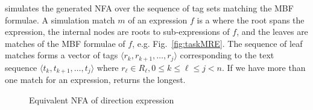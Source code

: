 \framework simulates the generated NFA over the sequence of tag sets matching the MBF formulae.
A simulation match $m$ of an expression $f$ is a  where the root spans the expression, the internal nodes are roots to sub-expressions of $f$, and the leaves are matches of the MBF formulae of $f$, e.g. Fig.~\ref{fig:taskMRE}.
The sequence of leaf matches forms a vector of tags $\langle r_k,r_{k+1},\dots,r_j\rangle$ 
corresponding to the text sequence 
$\langle t_k,t_{k+1},\dots,t_j\rangle$ where $r_{\ell}\in R_{\ell},0\le k\le \ell \le j < n$.
%
%
If we have more than one match for an expression, 
\framework returns the longest.


\setarab
\transfalse

\begin{figure}[tb!]
\centering
{}
  \caption{Equivalent NFA of direction expression}
  \label{fig:nfaEx}
\end{figure}
\transtrue
{}

